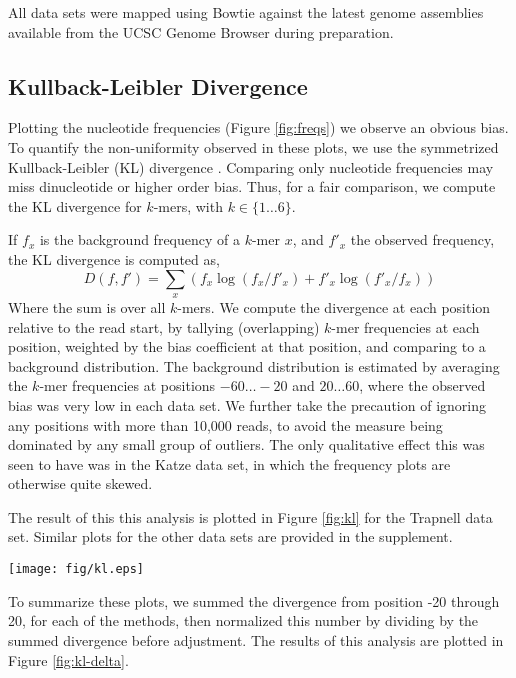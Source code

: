 \documentclass{bioinfo}
\begin{document}
All data sets were mapped using Bowtie \cite{Langmead2009} against the latest
genome assemblies available from the UCSC Genome Browser \cite{Karolchik2008}
during preparation.



\subsection{Kullback-Leibler Divergence}

Plotting the nucleotide frequencies (Figure  \ref{fig:freqs}) we observe an
obvious bias. To quantify the non-uniformity observed in these plots, we use the
symmetrized Kullback-Leibler (KL) divergence \cite{Kullback1951}. Comparing only
nucleotide frequencies may miss dinucleotide or higher order bias. Thus, for a fair
comparison, we compute the KL divergence for $k$-mers, with $k \in \{ 1 \dots 6
\}$.

If $f_x$ is the background frequency of a $k$-mer $x$, and $f'_x$ the observed
frequency, the KL divergence is computed as,
$$D( f, f' ) = \sum_{x} \left( f_x \log( f_x / f'_x ) + f'_x \log( f'_x / f_x) \right)$$
Where the sum is over all $k$-mers. We compute the divergence at each
position relative to the read start, by tallying (overlapping) $k$-mer
frequencies at each position, weighted by the bias coefficient at that position,
and comparing to a background distribution. The background distribution is
estimated by averaging the $k$-mer frequencies at positions $-60 \dots -20$ and
$20 \dots 60$, where the observed bias was very low in each data set.  We further
take the precaution of ignoring any positions with more than 10,000 reads, to
avoid the measure being dominated by any small group of outliers. The only
qualitative effect this was seen to have was in the Katze data set, in which the
frequency plots are otherwise quite skewed.

The result of this this analysis is plotted in Figure
\ref{fig:kl} for the Trapnell data set. Similar plots for the other data sets are
provided in the supplement.

\begin{figure*}
\centerline{\texttt{[image: fig/kl.eps]}}
\caption{Plots of the KL divergence over overlapping $k$-mers in the Trapnell
experiment.}
\label{fig:kl}
\end{figure*}

To summarize these plots, we summed the divergence from position -20
through 20, for each of the methods, then normalized this number by dividing by
the summed divergence before adjustment. The results of this analysis are plotted in
Figure \ref{fig:kl-delta}.
\end{document}
